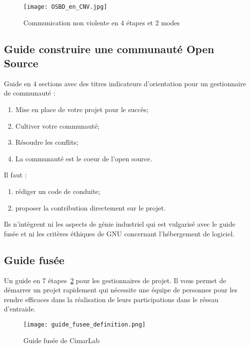 \begin{figure}[htb]
\centering
\texttt{[image: OSBD\_en\_CNV.jpg]}
\caption{Communication non violente en 4 étapes et 2 modes}
\label{fig:communication_non_violente}
\end{figure}

\subsection{Guide construire une communauté Open Source}
Guide en 4 sections avec des titres indicateurs d’orientation pour un gestionnaire de communauté :

\begin{enumerate}
    \item Mise en place de votre projet pour le succès;
    \item Cultiver votre communauté;
    \item Résoudre les conflits;
    \item La communauté est le coeur de l’open source.
\end{enumerate}

Il faut :
\begin{enumerate}
    \item rédiger un code de conduite;
    \item proposer la contribution directement sur le projet.
\end{enumerate}

Ils n'intègrent ni les aspects de génie industriel qui est vulgarisé avec le guide fusée et ni les critères éthiques de GNU concernant l’hébergement de logiciel.

\subsection{Guide fusée}

Un guide en 7 étapes~\ref{fig:guide_fusee} pour les gestionnaires de projet. Il vous permet de démarrer un projet rapidement qui nécessite une équipe de personnes pour les rendre efficaces dans la réalisation de leurs participations dans le réseau d’entraide.


\begin{figure}[htb]
\centering
\texttt{[image: guide\_fusee\_definition.png]}
\caption{Guide fusée de CimarLab}
\label{fig:guide_fusee}
\end{figure}

